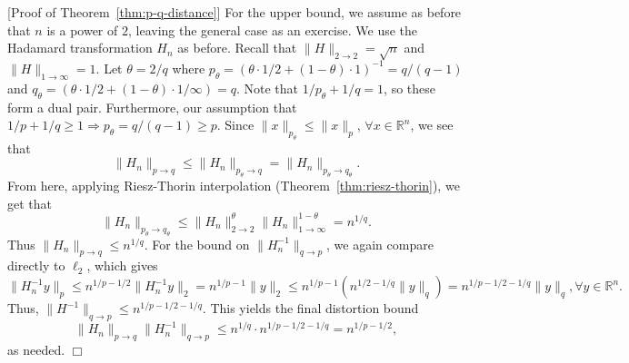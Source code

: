\documentclass[11pt]{article}
\theoremstyle{plain}
\newenvironment{proof}{\noindent {\sc Proof:}}{$\Box$ \medskip}
\theoremstyle{plain}
\newcommand{\R}{\ensuremath{\mathbb{R}}}
\begin{document}
\begin{proof}[Proof of Theorem~\ref{thm:p-q-distance}]
For the upper bound, we assume as before that $n$ is a power of $2$, leaving the
general case as an exercise. We use the Hadamard transformation $H_n$ as before.
Recall that $\|H\|_{2 \rightarrow 2} = \sqrt{n}$ and $\|H\|_{1 \rightarrow
\infty} = 1$. Let $\theta = 2/q$ where $p_\theta = (\theta \cdot 1/2 +
(1-\theta) \cdot 1)^{-1} = q/(q-1)$ and $q_\theta = (\theta \cdot 1/2 +
(1-\theta) \cdot 1/\infty) = q$. Note that $1/p_\theta + 1/q = 1$, so these form
a dual pair. Furthermore, our assumption that $1/p + 1/q \geq 1 \Rightarrow
p_\theta = q/(q-1) \geq p$. Since $\|x\|_{p_\theta} \leq \|x\|_p$, $\forall
x \in \R^n$, we see that 
\[
\|H_n\|_{p \rightarrow q} 
\leq \|H_n\|_{p_\theta \rightarrow q} = \|H_n\|_{p_\theta \rightarrow q_\theta}.
\]
From here, applying Riesz-Thorin interpolation (Theorem~\ref{thm:riesz-thorin}),
we get that 
\[
\|H_n\|_{p_\theta \rightarrow q_\theta} \leq \|H_n\|_{2 \rightarrow 2}^{\theta}
\|H_n\|_{1 \rightarrow \infty}^{1-\theta} = n^{1/q}.
\]
Thus $\|H_n\|_{p \rightarrow q} \leq n^{1/q}$. For the bound on $\|H_n^{-1}\|_{q
\rightarrow p}$, we again compare directly to $\ell_2$, which gives
\[
\|H_n^{-1} y\|_p \leq n^{1/p-1/2} \|H_n^{-1} y\|_2 = n^{1/p-1} \|y\|_2
\leq n^{1/p-1} (n^{1/2-1/q} \|y\|_q) = n^{1/p-1/2-1/q} \|y\|_q, \forall y \in
\R^n.
\]
Thus, $\|H^{-1}\|_{q \rightarrow p} \leq n^{1/p-1/2-1/q}$.  This yields the
final distortion bound 
\[
\|H_n\|_{p \rightarrow q} \|H_n^{-1}\|_{q \rightarrow p} \leq n^{1/q} \cdot
n^{1/p-1/2-1/q} = n^{1/p-1/2},
\]
as needed.
\end{proof}



\end{document}
